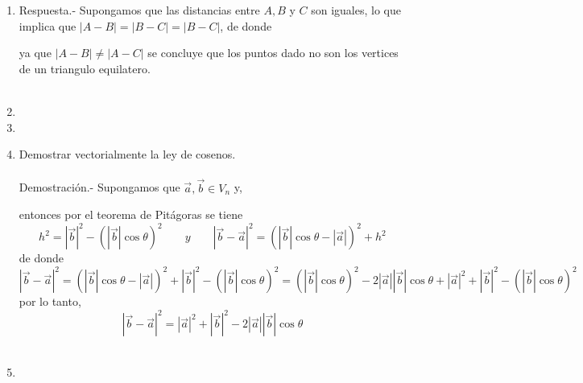 \begin{enumerate}
\item 
    Respuesta.-\; Supongamos que las distancias entre $A,B$ y $C$ son iguales, lo que implica que $|A-B|=|B-C|=|B-C|$, de donde 
    \begin{center}
	\begin{tabular}{rcl} 
	    $|A-B|$&$=$&$\sqrt{\sqrt{53}}$\\\\
	    $|A-C|$&$=$&$\sqrt{80}$\\\\
	    $$&$=$&$$\\\\
	\end{tabular}
    \end{center}
    ya que $|A-B|\neq |A-C|$ se concluye que los puntos dado no son los vertices de un triangulo equilatero.\\\\ 

\item 

\item 

\item Demostrar vectorialmente la ley de cosenos.\\\\
    Demostración.-\; Supongamos que $\vec{a},\vec{b} \in V_n$ y, 
    \begin{center}
    \end{center}
    entonces por el teorema de Pitágoras se tiene $$h^2=|\vec{b}|^2 - \left(|\vec{b}|\cos \theta\right)^2 \qquad y \qquad |\vec{b}-\vec{a}|^2 = \left(|\vec{b}|\cos \theta - |\vec{a}|\right)^2+h^2$$
    de donde $$|\vec{b}-\vec{a}|^2 = \left(|\vec{b}|\cos \theta - |\vec{a}|\right)^2+|\vec{b}|^2 - \left(|\vec{b}|\cos \theta\right)^2 = \left(|\vec{b}|\cos \theta\right)^2 - 2|\vec{a}||\vec{b}|\cos \theta + |\vec{a}|^2 + |\vec{b}|^2 - \left(|\vec{b}|\cos \theta\right)^2$$
    por lo tanto, $$|\vec{b}-\vec{a}|^2 = |\vec{a}|^2 + |\vec{b}|^2 - 2|\vec{a}||\vec{b}|\cos \theta $$\\

\item 

    


\end{enumerate}


